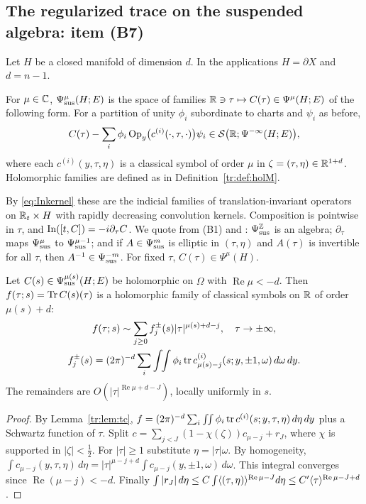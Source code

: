 \subsection{The regularized trace on the suspended algebra: item (B7)}
\label{tr:subsec:sus}

Let \(H\) be a closed manifold of dimension \(d\). In the applications
\(H=\partial X\) and \(d=n-1\).

\begin{definition}\label{tr:def:sus}
For \(\mu\in\mathbb C\), \(\Psi_{\mathrm{sus}}^\mu(H;E)\) is the space of families
\(\mathbb R\ni\tau\mapsto C(\tau)\in\Psi^\mu(H;E)\) of the following form. For a
partition of unity \(\phi_i\) subordinate to charts and \(\psi_i\) as
before,
\[
 C(\tau)-\sum_i\phi_i\operatorname{Op}_y\bigl(c^{(i)}(\cdot,\tau,\cdot)\bigr)\psi_i\in
 \mathcal S\bigl(\mathbb R;\Psi^{-\infty}(H;E)\bigr),
\]
where each \(c^{(i)}(y,\tau,\eta)\) is a classical symbol of order \(\mu\) in
\(\zeta=(\tau,\eta)\in\mathbb R^{1+d}\). Holomorphic families are defined as in
Definition~\ref{tr:def:holM}.
\end{definition}

By \eqref{eq:Inkernel} these are the indicial families of
translation-invariant operators on \(\mathbb R_t\times H\) with rapidly decreasing
convolution kernels. Composition is pointwise in \(\tau\), and
\(\operatorname{In}([t,C])=-i\partial_\tau C\). We quote from (B1) and
\cite{MelroseEta}: \(\Psi_{\mathrm{sus}}^{\mathbb Z}\) is an algebra; \(\partial_\tau\) maps
\(\Psi_{\mathrm{sus}}^\mu\) to \(\Psi_{\mathrm{sus}}^{\mu-1}\); and if \(A\in\Psi_{\mathrm{sus}}^m\) is elliptic in
\((\tau,\eta)\) and \(A(\tau)\) is invertible for all \(\tau\), then
\(A^{-1}\in\Psi_{\mathrm{sus}}^{-m}\). For fixed \(\tau\), \(C(\tau)\in\Psi^\mu(H)\).

\begin{lemma}\label{tr:lem:susTr}
Let \(C(s)\in\Psi_{\mathrm{sus}}^{\mu(s)}(H;E)\) be holomorphic on \(\Omega\) with
\(\operatorname{Re}\mu<-d\). Then \(f(\tau;s)=\operatorname{Tr} C(s)(\tau)\) is a
holomorphic family of classical symbols on \(\mathbb R\) of order \(\mu(s)+d\):
\begin{gather*}
 f(\tau;s)\sim\sum_{j\ge0}f^\pm_j(s)|\tau|^{\mu(s)+d-j},\quad\tau\to\pm\infty,\\
 f^\pm_j(s)=(2\pi)^{-d}\sum_i\int\!\!\int\phi_i\operatorname{tr}
 c^{(i)}_{\mu(s)-j}(s;y,\pm1,\omega)\,d\omega\,dy .
\end{gather*}
The remainders are \(O(|\tau|^{\operatorname{Re}\mu+d-J})\), locally
uniformly in \(s\).
\end{lemma}

\begin{proof}
By Lemma~\ref{tr:lem:tc}, \(f=(2\pi)^{-d}\sum_i\int\!\!\int\phi_i\operatorname{tr}
c^{(i)}(s;y,\tau,\eta)\,d\eta\,dy\) plus a Schwartz function of \(\tau\).
Split \(c=\sum_{j<J}(1-\chi(\zeta))c_{\mu-j}+r_J\), where \(\chi\) is supported
in \(|\zeta|<\frac12\). For \(|\tau|\ge1\) substitute \(\eta=|\tau|\omega\).
By homogeneity, \(\int c_{\mu-j}(y,\tau,\eta)\,d\eta=|\tau|^{\mu-j+d}\int
c_{\mu-j}(y,\pm1,\omega)\,d\omega\). This integral converges since
\(\operatorname{Re}(\mu-j)<-d\). Finally
\(\int|r_J|\,d\eta\le C\int\langle (\tau,\eta)\rangle^{\operatorname{Re}\mu-J}
d\eta\le C'\langle \tau\rangle^{\operatorname{Re}\mu-J+d}\).
\end{proof}

